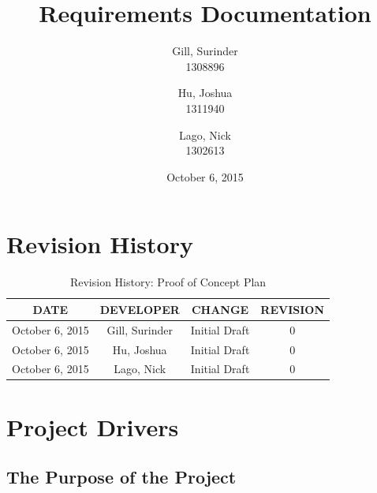 \documentclass[11pt, oneside]{article}   	%
\title{Requirements Documentation}
\author{Gill, Surinder\\
		1308896
		\and
		Hu, Joshua\\
		1311940
		\and
		Lago, Nick\\
		1302613}
\date{October 6, 2015}							%
\begin{document}
\maketitle
\newpage
\tableofcontents
\newpage

\section*{Revision History}

\begin{table}[hp]
\caption{Revision History: Proof of Concept Plan}
\begin{center}
\label{tab:}
\begin{tabular}{|c|c|c|c|}
\hline
\textbf{DATE} & \textbf{DEVELOPER} & \textbf{CHANGE} & \textbf{REVISION}\\
\hline
October 6, 2015 & Gill, Surinder & Initial Draft & 0\\
\hline
October 6, 2015 & Hu, Joshua & Initial Draft & 0\\
\hline
October 6, 2015 & Lago, Nick & Initial Draft & 0\\
\hline
\end{tabular}
\end{center}
\label{default}
\end{table}


\newpage
\section*{Project Drivers}
\subsection*{The Purpose of the Project}
\end{document}
